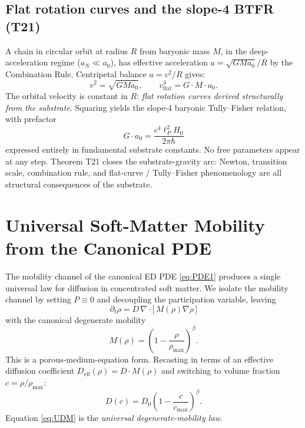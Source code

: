 \documentclass[11pt,a4paper]{article}
\begin{document}
\subsection{Flat rotation curves and the slope-4 BTFR (T21)}

A chain in circular orbit at radius $R$ from baryonic mass $M$, in the deep-acceleration regime ($a_N \ll a_0$), has effective acceleration $a = \sqrt{GMa_0}/R$ by the Combination Rule. Centripetal balance $a = v^2/R$ gives:
\begin{equation}
\boxed{\; v^2 = \sqrt{G M a_0}, \qquad v_\mathrm{flat}^4 = G \cdot M \cdot a_0. \;}
\end{equation}
The orbital velocity is constant in $R$: \emph{flat rotation curves derived structurally from the substrate}. Squaring yields the slope-4 baryonic Tully--Fisher relation, with prefactor
\begin{equation}
G \cdot a_0 = \frac{c^4 \ell_P^2 H_0}{2\pi \hbar}
\end{equation}
expressed entirely in fundamental substrate constants. No free parameters appear at any step. Theorem T21 closes the substrate-gravity arc: Newton, transition scale, combination rule, and flat-curve / Tully--Fisher phenomenology are all structural consequences of the substrate.

\section{Universal Soft-Matter Mobility from the Canonical PDE}\label{sec:cm}

The mobility channel of the canonical ED PDE \eqref{eq:PDE1} produces a single universal law for diffusion in concentrated soft matter. We isolate the mobility channel by setting $P \equiv 0$ and decoupling the participation variable, leaving
\begin{equation}
\partial_t \rho = D\,\nabla \cdot \bigl[\, M(\rho) \nabla \rho \,\bigr]
\end{equation}
with the canonical degenerate mobility
\begin{equation}
M(\rho) = \left(1 - \frac{\rho}{\rho_\mathrm{max}}\right)^\beta.
\end{equation}
This is a porous-medium-equation form. Recasting in terms of an effective diffusion coefficient $D_\mathrm{eff}(\rho) = D \cdot M(\rho)$ and switching to volume fraction $c = \rho/\rho_\mathrm{max}$:
\begin{equation}
\boxed{\; D(c) = D_0 \left(1 - \frac{c}{c_\mathrm{max}}\right)^\beta. \;}
\label{eq:UDM}
\end{equation}
Equation \eqref{eq:UDM} is the \emph{universal degenerate-mobility law}.
\end{document}
